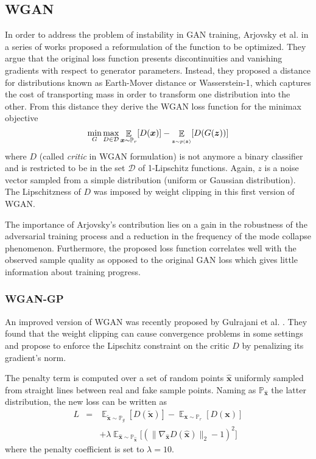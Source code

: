 \documentclass[times,twocolumn]{article}
\begin{document}
\subsection{WGAN}
In order to address the problem of instability in GAN training, Arjovsky et al. in a series of works \cite{Arjovsky2017, Arjovsky2017b} proposed a reformulation of the function to be optimized. They argue that the original loss function presents discontinuities and vanishing gradients with respect to generator parameters. Instead, they proposed a distance for distributions known as Earth-Mover distance or Wasserstein-1, which captures the cost of transporting mass in order to transform one distribution into the other. From this distance they derive the WGAN loss function for the minimax objective
\begin{equation}
\mathop{\textup{min}}_{G} \mathop{\textup{max}}_{D\in\mathcal{D}} \mathop{\mathbb{E}}_{\bm{x} \sim  \mathbb{P}_r}[D(\bm{x})] - \mathop{\mathbb{E}}_{_{\bm{z} \sim p(\bm{z})}}[D(G(\bm{z}))]
\end{equation}
where $D$ (called \textit{critic} in WGAN formulation) is not anymore a binary classifier and is restricted to be in the set $\mathcal{D}$ of 1-Lipschitz functions. Again, $z$ is a noise vector sampled from a simple distribution (uniform or Gaussian distribution). The Lipschitzness of $D$ was imposed by weight clipping in this first version of WGAN.

The importance of Arjovsky's contribution lies on a gain in the robustness of the adversarial training process and a reduction in the frequency of the mode collapse phenomenon. Furthermore, the proposed loss function correlates well with the observed sample quality as opposed to the original GAN loss which gives little information about training progress.
\subsubsection{WGAN-GP}
An improved version of WGAN was recently proposed by Gulrajani et al. \cite{Gulrajani2017}. They found that the weight clipping can cause convergence problems in some settings and propose to enforce the Lipschitz constraint on the critic $D$ by penalizing its gradient's norm.

The penalty term is computed over a set of random points $\hat{\bm{x}}$ uniformly sampled from straight lines between real and fake sample points. Naming as $\mathbb{P}_{\hat{\bm{x}}}$ the latter distribution, the new loss can be written as
\begin{eqnarray}
L &=& \mathop{\mathbb{E}}_{\tilde {\bm{x}} \sim  \mathbb{P}_g}[D(\tilde{\bm{x}})] - \mathop{\mathbb{E}}_{\bm{x} \sim  \mathbb{P}_r}[D(\bm{x})] \nonumber \\
&&+ \lambda \mathop{\mathbb{E}}_{\hat{\bm{x}} \sim  \mathbb{P}_{\hat{\bm{x}}}}\big[(\|\nabla_{\hat{\bm{x}}}D(\hat{\bm{x}}) \|_2-1)^2\big]
\end{eqnarray}
where the penalty coefficient is set to $\lambda=10$.
\end{document}
